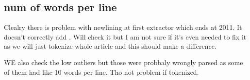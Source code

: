 \documentclass{article}
\begin{document}
    \subsection{num of words per line}
    Clealry there is problem with newlining at first extractor which ends at 2011. It doesn't correctly add \n. Will check it but I am not sure if it's even needed to fix it as we will just tokenize whole article and this should make a difference.

    WE also check the low outliers but those were probbaly wrongly parsed as some of them had like 10 words per line. Tho not problem if tokenized.


    



    \printbibliography
\end{document}
